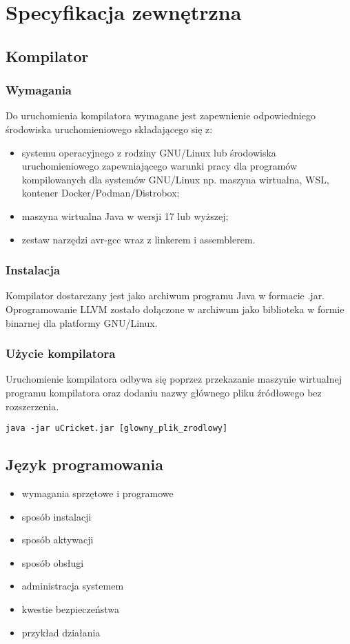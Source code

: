 \chapter{Specyfikacja zewnętrzna}
\label{ch:04}
\section{Kompilator}
\subsection{Wymagania}
Do uruchomienia kompilatora wymagane jest zapewnienie odpowiedniego środowiska uruchomieniowego składającego się z:
\begin{itemize}
\item systemu operacyjnego z rodziny GNU/Linux lub środowiska uruchomieniowego zapewniającego warunki pracy dla programów kompilowanych dla systemów GNU/Linux np. maszyna wirtualna, WSL, kontener Docker/Podman/Distrobox;
\item maszyna wirtualna Java w wersji 17 lub wyższej;
\item zestaw narzędzi avr-gcc wraz z linkerem i assemblerem.
\end{itemize}

\subsection{Instalacja}
Kompilator dostarczany jest jako archiwum programu Java w formacie .jar. Oprogramowanie LLVM zostało dołączone w archiwum jako biblioteka w formie binarnej dla platformy GNU/Linux.

\subsection{Użycie kompilatora}
Uruchomienie kompilatora odbywa się poprzez przekazanie maszynie wirtualnej programu kompilatora oraz dodaniu nazwy głównego pliku źródłowego bez rozszerzenia.
\begin{lstlisting}
java -jar uCricket.jar [glowny_plik_zrodlowy]
\end{lstlisting}

\section{Język programowania}

\begin{itemize}
\item  wymagania sprzętowe i programowe
\item  sposób instalacji
\item  sposób aktywacji
\item  sposób obsługi
\item  administracja systemem
\item  kwestie bezpieczeństwa
\item  przykład działania
\end{itemize}

